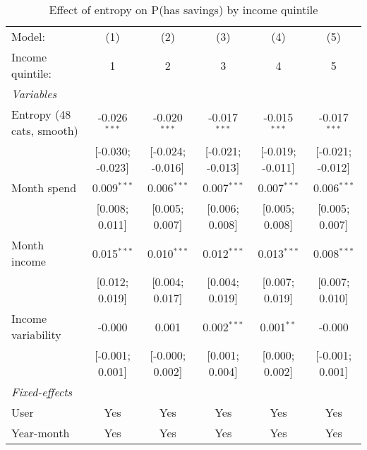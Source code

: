 
\begin{table}[htbp]
   \centering
   \tiny
   \begin{threeparttable}[b]
      \caption{\label{tab:reg_has_inflows_entropy_tag_spend_sz_inc_quint} Effect of entropy on P(has savings) by income quintile}
      \begin{tabular}{lccccc}
         \tabularnewline \midrule \midrule
         Model:                    & (1)              & (2)              & (3)              & (4)              & (5)\\  
         Income quintile:          & 1                & 2                & 3                & 4                & 5 \\   
         \midrule
         \emph{Variables}\\
         Entropy (48 cats, smooth) & -0.026$^{***}$   & -0.020$^{***}$   & -0.017$^{***}$   & -0.015$^{***}$   & -0.017$^{***}$\\   
                                   & [-0.030; -0.023] & [-0.024; -0.016] & [-0.021; -0.013] & [-0.019; -0.011] & [-0.021; -0.012]\\   
         Month spend               & 0.009$^{***}$    & 0.006$^{***}$    & 0.007$^{***}$    & 0.007$^{***}$    & 0.006$^{***}$\\   
                                   & [0.008; 0.011]   & [0.005; 0.007]   & [0.006; 0.008]   & [0.005; 0.008]   & [0.005; 0.007]\\   
         Month income              & 0.015$^{***}$    & 0.010$^{***}$    & 0.012$^{***}$    & 0.013$^{***}$    & 0.008$^{***}$\\   
                                   & [0.012; 0.019]   & [0.004; 0.017]   & [0.004; 0.019]   & [0.007; 0.019]   & [0.007; 0.010]\\   
         Income variability        & -0.000           & 0.001            & 0.002$^{***}$    & 0.001$^{**}$     & -0.000\\   
                                   & [-0.001; 0.001]  & [-0.000; 0.002]  & [0.001; 0.004]   & [0.000; 0.002]   & [-0.001; 0.001]\\   
         \midrule
         \emph{Fixed-effects}\\
         User                      & Yes              & Yes              & Yes              & Yes              & Yes\\  
         Year-month                & Yes              & Yes              & Yes              & Yes              & Yes\\  
         \midrule

\end{tabular}
\end{threeparttable}
\end{table}
